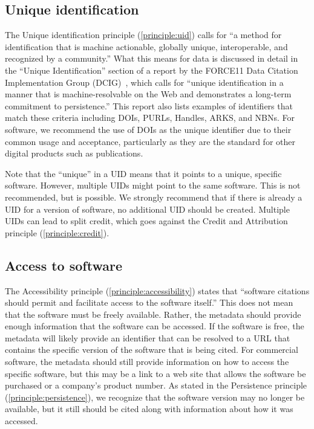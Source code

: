 \documentclass[11pt, oneside]{amsart}
\newcommand{\katznote}[1]{ {\textcolor{blue} { ***DSK: #1 }}} %
\newcommand{\LJHnote}[1]{ {\textcolor{fuschsia} { ***LJH: #1 }}} %
\begin{document}
\subsection{Unique identification}

The Unique identification principle (\ref{principle:uid}) calls for ``a method for identification that is machine actionable, globally unique, interoperable, and recognized by a community.''
What this means for data is discussed in detail in the ``Unique Identification'' section of a report by the FORCE11 Data Citation Implementation Group (DCIG)~\cite{10.7717/peerj-cs.1}, which calls for ``unique identification in a manner that is machine-resolvable on the Web and demonstrates a long-term commitment to persistence.''
This report also lists examples of identifiers that match these criteria including DOIs, PURLs, Handles, ARKS, and NBNs.
For software, we recommend the use of DOIs as the unique identifier due to their common usage and acceptance, particularly as they are the standard for other digital products such as publications.

Note that the ``unique'' in a UID means that it points to a unique, specific software. However, multiple UIDs might point to the same software.
This is not recommended, but is possible.
We strongly recommend that if there is already a UID for a version of software, no additional UID should be created.
Multiple UIDs can lead to split credit, which goes against the Credit and Attribution principle (\ref{principle:credit}).


\subsection{Access to software}

The Accessibility principle (\ref{principle:accessibility}) states that ``software citations should permit and facilitate access to the software itself.''
This does not mean that the software must be freely available.
Rather, the metadata should provide enough information that the software can be accessed.
If the software is free, the metadata will likely provide an identifier that can be resolved to a URL that contains the specific version of the software that is being cited.
For commercial software, the metadata should still provide information on how to access the specific software, but this may be a link to a web site that allows the software be purchased or a company's product number.
As stated in the Persistence principle (\ref{principle:persistence}), we recognize that the software version may no longer be available, but it still should be cited along with information about how it was accessed.
\end{document}
